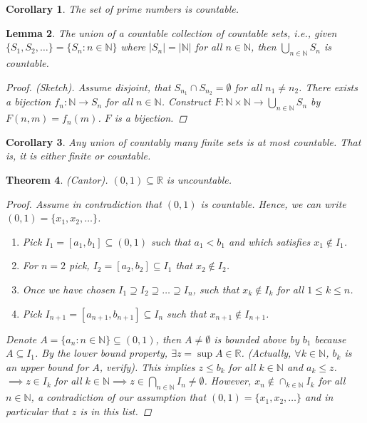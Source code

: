 \documentclass[10pt]{article}
\newcommand{\N}{\mathbb{N}}
\newcommand{\R}{\mathbb{R}}
\newcommand{\abs}[1]{\left| #1 \right|}
\newtheorem{theorem}{Theorem}[section]
\newtheorem{corollary}[theorem]{Corollary}
\newtheorem{lemma}[theorem]{Lemma}
\theoremstyle{definition}
\theoremstyle{remark}
\begin{document}
\begin{corollary}
    The set of prime numbers is countable.
\end{corollary}

\begin{lemma}
    The union of a countable collection of countable sets, i.e., given
    $\{S_1, S_2, \ldots\} = \{S_n : n \in \N\}$ where $\abs{S_n} = \abs{\N}$ for all $n \in \N$,
    then $\bigcup_{n \in \N} S_n$ is countable.
    \begin{proof}
        (Sketch). Assume disjoint, that $S_{n_1} \cap S_{n_2} = \emptyset$ for all $n_1 \neq n_2$.
        There exists a bijection $f_n: \N \to S_n$ for all $n \in \N$.
        Construct $F: \N \times \N \to \bigcup_{n \in \N} S_n$ by $F(n, m) = f_n(m)$.
        $F$ is a bijection.
    \end{proof}
\end{lemma}

\begin{corollary}
    Any union of countably many finite sets is at most countable. That is, it is either finite or countable.
\end{corollary}

\begin{theorem}
    (Cantor).
    $(0, 1) \subseteq \R$ is uncountable.
    \begin{proof}
        Assume in contradiction that $(0, 1)$ is countable. Hence, we can write $(0, 1) = \{x_1, x_2, \ldots\}$.
        \begin{enumerate}
            \item
                Pick $I_1 = [a_1,  b_1] \subseteq (0, 1)$ such that $a_1 < b_1$ and which satisfies $x_1 \not\in I_1$.
            \item For $n = 2$ pick, $I_2 = [a_2, b_2] \subseteq I_1$ that $x_2 \not\in I_2$.
            \item Once we have chosen $I_1 \supseteq I_2 \supseteq \ldots \supseteq I_n$, such that $x_k \not\in I_k$ for all $1 \leq k \leq n$.
            \item Pick $I_{n+1} = [a_{n+1}, b_{n+1}] \subseteq I_n$ such that $x_{n+1} \not\in I_{n+1}$.
        \end{enumerate}
        Denote $A = \{a_n : n \in \N\} \subseteq (0, 1)$, then $A \neq \emptyset$ is bounded above by $b_1$ because $A \subseteq I_1$.
        By the lower bound property, $\exists z = \sup A \in \R$.
        (Actually, $\forall k \in \N$, $b_k$ is an upper bound for $A$, verify).
        This implies $z \leq b_k$ for all $k \in \N$ and $a_k \leq z$.
        $\implies z \in I_k$ for all $k \in \N \implies z \in \bigcap_{n \in \N} I_n \neq \emptyset$.
        However, $x_n \not\in \cap_{k \in \N} I_k$ for all $n \in \N$, a contradiction of our assumption that
        $(0, 1) = \{x_1, x_2, \ldots\}$ and in particular that $z$ is in this list.
    \end{proof}
\end{theorem}
\end{document}
